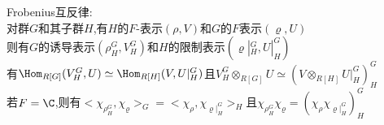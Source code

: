 \begin{dingli}
Frobenius互反律:\\
对群$G$和其子群$H$,有$H$的$F$-表示$(\rho,V)$和$G$的$F$表示$(\varrho,U)$\\
则有$G$的诱导表示$(\rho_{H}^{G},V_{H}^{G})$和$H$的限制表示$(\varrho|_{H}^{G},U|_{H}^{G})$\\
有$\Hom_{R[G]}(V_{H}^{G},U)\simeq\Hom_{R[H]}(V,U|_{H}^{G})$且$V_{H}^{G}\otimes_{R[G]}U\simeq (V\otimes_{R[H]}U|_{H}^{G})_{H}^{G}$\\
若$F=\C$,则有$<\chi_{\rho_{H}^{G}},\chi_{\varrho}>_{G}=<\chi_{\rho},\chi_{\varrho|_{H}^{G}}>_{H}$且$\chi_{\rho_{H}^{G}}\chi_{\varrho}=(\chi_{\rho}\chi_{\varrho|_{H}^{G}})_{H}^{G}$
\end{dingli}


%